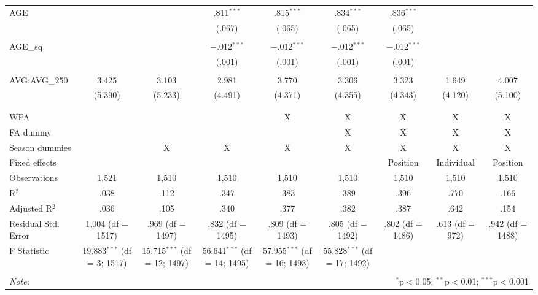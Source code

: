 \begin{table}[H]
\begin{tabular}{@{\extracolsep{5pt}}lcccccccc}
 AGE &  &  & .811$^{***}$ & .815$^{***}$ & .834$^{***}$ & .836$^{***}$ &  &  \\
  &  &  & (.067) & (.065) & (.065) & (.065) &  &  \\
  & & & & & & & & \\
 AGE\_sq &  &  & $-$.012$^{***}$ & $-$.012$^{***}$ & $-$.012$^{***}$ & $-$.012$^{***}$ &  &  \\
  &  &  & (.001) & (.001) & (.001) & (.001) &  &  \\
  & & & & & & & & \\
 AVG:AVG\_250 & 3.425 & 3.103 & 2.981 & 3.770 & 3.306 & 3.323 & 1.649 & 4.007 \\
  & (5.390) & (5.233) & (4.491) & (4.371) & (4.355) & (4.343) & (4.120) & (5.100) \\
  & & & & & & & & \\
\hline \\[-1.8ex]
WPA &  &  &  & X & X & X & X & X \\
FA dummy &  &  &  &  & X & X & X & X \\
Season dummies &  & X & X & X & X & X & X & X \\
Fixed effects &  &  &  &  &  & Position & Individual & Position \\
Observations & 1,521 & 1,510 & 1,510 & 1,510 & 1,510 & 1,510 & 1,510 & 1,510 \\
R$^{2}$ & .038 & .112 & .347 & .383 & .389 & .396 & .770 & .166 \\
Adjusted R$^{2}$ & .036 & .105 & .340 & .377 & .382 & .387 & .642 & .154 \\
Residual Std. Error & 1.004 (df = 1517) & .969 (df = 1497) & .832 (df = 1495) & .809 (df = 1493) & .805 (df = 1492) & .802 (df = 1486) & .613 (df = 972) & .942 (df = 1488) \\
F Statistic & 19.883$^{***}$ (df = 3; 1517) & 15.715$^{***}$ (df = 12; 1497) & 56.641$^{***}$ (df = 14; 1495) & 57.955$^{***}$ (df = 16; 1493) & 55.828$^{***}$ (df = 17; 1492) &  &  &  \\
\hline
\hline \\[-1.8ex]
\textit{Note:}  & \multicolumn{8}{r}{$^{*}$p$<$0.05; $^{**}$p$<$0.01; $^{***}$p$<$0.001} \\
\end{tabular}
\end{table}
